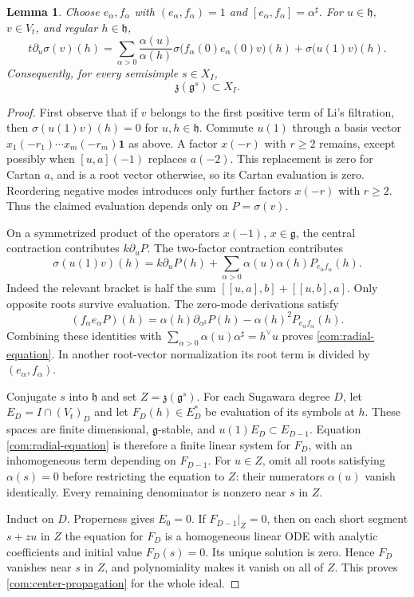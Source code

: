 \documentclass[11pt,a4paper]{amsart}
\numberwithin{equation}{section}
\newtheorem{lemma}[theorem]{Lemma}
\theoremstyle{definition}
\theoremstyle{remark}
\newcommand{\g}{\mathfrak g}
\newcommand{\h}{\mathfrak h}
\begin{document}
\begin{lemma}\label{com:radial}
Choose $e_\alpha,f_\alpha$ with
$(e_\alpha,f_\alpha)=1$ and
$[e_\alpha,f_\alpha]=\alpha^\sharp$.
For $u\in\h$, $v\in V_t$, and regular $h\in\h$,
\begin{equation}\label{com:radial-equation}
 t\partial_u\sigma(v)(h)=
 \sum_{\alpha>0}\frac{\alpha(u)}{\alpha(h)}
 \sigma\bigl(f_\alpha(0)e_\alpha(0)v\bigr)(h)
 +\sigma\bigl(u(1)v\bigr)(h).
\end{equation}
Consequently, for every semisimple $s\in X_I$,
\begin{equation}\label{com:center-propagation}
                 \mathfrak z(\g^s)\subset X_I.
\end{equation}
\end{lemma}
\begin{proof}
First observe that if $v$ belongs to the first positive term of Li's filtration, then
$\sigma(u(1)v)(h)=0$ for $u,h\in\h$. Commute $u(1)$ through a
basis vector $x_1(-r_1)\cdots x_m(-r_m)\mathbf1$ as above.
A factor $x(-r)$ with $r\ge2$ remains,
except possibly when $[u,a](-1)$ replaces $a(-2)$. This replacement is
zero for Cartan $a$, and is a root vector otherwise, so its Cartan
evaluation is zero. Reordering negative modes introduces only further
factors $x(-r)$ with $r\ge2$. Thus the claimed evaluation depends only
on $P=\sigma(v)$.

On a symmetrized product of the operators $x(-1)$, $x\in\g$, the central contraction contributes
$k\partial_uP$. The two-factor contraction contributes
$$
 \sigma(u(1)v)(h)=k\partial_uP(h)+
 \sum_{\alpha>0}\alpha(u)\alpha(h)
                       P_{e_\alpha f_\alpha}(h).
$$
Indeed the relevant bracket is half the sum
$[[u,a],b]+[[u,b],a]$. Only opposite roots survive evaluation.
The zero-mode derivations satisfy
$$
 (f_\alpha e_\alpha P)(h)=
 \alpha(h)\partial_{\alpha^\sharp}P(h)
 -\alpha(h)^2P_{e_\alpha f_\alpha}(h).
$$
Combining these identities with
$\sum_{\alpha>0}\alpha(u)\alpha^\sharp=h^\vee u$
proves \eqref{com:radial-equation}. In another root-vector
normalization its root term is divided by $(e_\alpha,f_\alpha)$.

Conjugate $s$ into $\h$ and set $Z=\mathfrak z(\g^s)$.
For each Sugawara degree $D$, let $E_D=I\cap(V_t)_D$ and let
$F_D(h)\in E_D^*$ be evaluation of its symbols at $h$.
These spaces are finite dimensional, $\g$-stable, and
$u(1)E_D\subset E_{D-1}$. Equation
\eqref{com:radial-equation} is therefore a finite linear system for
$F_D$, with an inhomogeneous term depending on $F_{D-1}$.
For $u\in Z$, omit all roots satisfying $\alpha(s)=0$ before
restricting the equation to $Z$: their numerators $\alpha(u)$ vanish
identically. Every remaining denominator is nonzero near $s$ in $Z$.

Induct on $D$. Properness gives $E_0=0$. If $F_{D-1}|_Z=0$, then
on each short segment $s+zu$ in $Z$ the equation for $F_D$ is a
homogeneous linear ODE with analytic coefficients and initial value
$F_D(s)=0$. Its unique solution is zero. Hence $F_D$ vanishes near
$s$ in $Z$, and polynomiality makes it vanish on all of $Z$.
This proves \eqref{com:center-propagation} for the whole ideal.
\end{proof}
\end{document}
